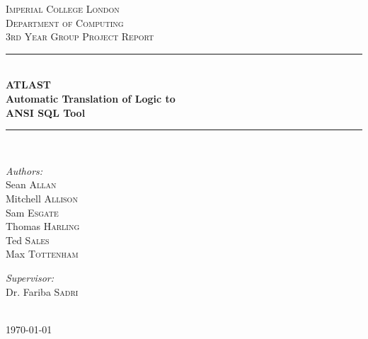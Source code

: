 \documentclass[a4paper, 11pt]{article}
\begin{document}
\begin{titlepage}

\newcommand{\HRule}{\rule{\linewidth}{0.5mm}} %

\center

\vspace*{2cm}
\textsc{\LARGE Imperial College London}\\[1.5cm]
\textsc{\Large Department of Computing}\\[0.5cm]
\textsc{\large 3rd Year Group Project Report}\\[0.5cm]

\HRule \\[0.4cm]
{\huge \bfseries ATLAST}\\[0.6cm]
{\huge \bfseries Automatic Translation of Logic to}\\[0.2cm]
{\huge \bfseries ANSI SQL Tool}\\[0.4cm]%
\HRule \\[1.5cm]

\begin{minipage}[t]{0.4\textwidth}
  \begin{flushleft} \large
    \emph{Authors:}\\
    Sean \textsc{Allan}\\
    Mitchell \textsc{Allison}\\
    Sam \textsc{Esgate}\\
    Thomas \textsc{Harling}\\
    Ted \textsc{Sales}\\
    Max \textsc{Tottenham}
  \end{flushleft}
\end{minipage}%
%
\begin{minipage}[t]{0.4\textwidth}
  \begin{flushright} \large
    \emph{Supervisor:} \\
    Dr. Fariba \textsc{Sadri}  %
  \end{flushright}
\end{minipage}%
\\[4cm]

{\large \today}\\[3cm] %

\vfill %

\end{titlepage}
\end{document}
